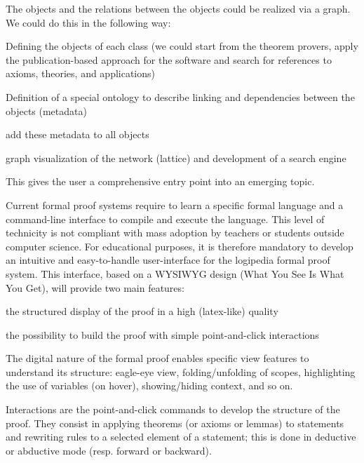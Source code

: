 \begin{workpackage}[id=dissemination,wphases=0-48,type=MGT,
  short=Dissemination,%
  title={Dissemination, communication and exploitation},
  lead=Inr]
\begin{tasklist}
\begin{task}[id=zib,
      title=Expanding the use of Logipedia in publishing,
      lead=Zib,ZibRM=12]
    The objects and the relations between the objects could be
    realized via a graph.  We could do this in the following way:
    \begin{compactitem}
    \item Defining the objects of each class (we could start from the
      theorem provers, apply the publication-based approach for the
      software and search for references to axioms, theories, and
      applications)
    \item Definition of a special ontology to describe linking and
      dependencies between the objects (metadata)
    \item add these metadata to all objects
    \item graph visualization of the network (lattice) and development
      of a search engine
    \end{compactitem}    
    This gives the user a comprehensive entry point into an emerging
    topic.
  \end{task}

  \begin{task}[id=edukera,
      title=Web interface for doing proofs at school,
      lead=Edu,EduRM=12]
      Current formal proof systems require to learn a specific formal
      language and a command-line interface to compile and execute the
      language.  This level of technicity is not compliant with mass
      adoption by teachers or students outside computer science. For
      educational purposes, it is therefore mandatory to develop an
      intuitive and easy-to-handle user-interface for the logipedia
      formal proof system. This interface, based on a WYSIWYG design
      (What You See Is What You Get), will provide two main features:
      \begin{compactitem}
      \item the structured display of the proof in a high (latex-like) quality
      \item the possibility to build the proof with simple
        point-and-click interactions
      \end{compactitem}

      The digital nature of the formal proof enables specific view features to
      understand its structure: eagle-eye view, folding/unfolding of scopes,
      highlighting the use of variables (on hover), showing/hiding context,
      and so on.

      Interactions are the point-and-click commands to develop the structure
      of the proof. They consist in applying theorems (or axioms or lemmas)
      to statements and rewriting rules to a selected element of a statement;
      this is done in deductive or abductive mode (resp. forward or backward).


\end{task}
\end{tasklist}
\end{workpackage}

